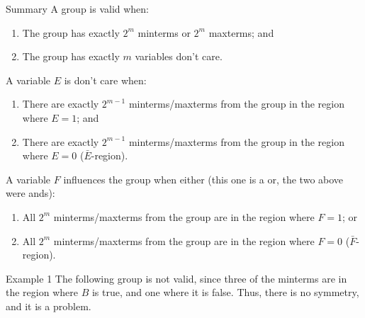 \documentclass[a4paper]{article}
\begin{document}
\begin{parag}{Summary}
    A group is valid when:
    \begin{enumerate}
        \item The group has exactly $2^m$ minterms or $2^m$ maxterms; and
        \item The group has exactly $m$ variables don't care.
    \end{enumerate}

    A variable $E$ is don't care when: 
    \begin{enumerate}
        \item There are exactly $2^{m-1}$ minterms/maxterms from the group in the region where $E = 1$; and
        \item There are exactly $2^{m-1}$ minterms/maxterms from the group in the region where $E = 0$ ($\bar{E}$-region).
    \end{enumerate}
    
    A variable $F$ influences the group when either (this one is a or, the two above were ands): 
    \begin{enumerate}
        \item All $2^m$ minterms/maxterms from the group are in the region where $F = 1$; or
        \item All $2^m$ minterms/maxterms from the group are in the region where $F = 0$ ($\bar{F}$-region).
    \end{enumerate}
    
\end{parag}

\begin{parag}{Example 1}
    The following group is not valid, since three of the minterms are in the region where $B$ is true, and one where it is false. Thus, there is no symmetry, and it is a problem.
\end{parag}
    
\end{document}

